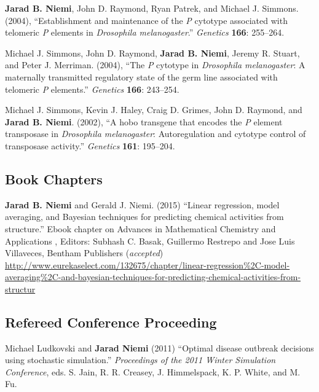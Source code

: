 \documentclass[overlapped,line]{res}
\begin{document}
\begin{resume}
{\bf Jarad B. Niemi}, John D. Raymond, Ryan Patrek, and Michael J. Simmons. (2004), ``Establishment and maintenance of the \emph{P} cytotype associated with telomeric \emph{P} elements in \emph{Drosophila melanogaster}.'' \emph{Genetics} {\bf 166}: 255--264.

Michael J. Simmons, John D. Raymond, {\bf Jarad B. Niemi}, Jeremy R. Stuart, and Peter J. Merriman. (2004), ``The \emph{P} cytotype in \emph{Drosophila melanogaster}: A maternally transmitted regulatory state of the germ line associated with telomeric \emph{P} elements.'' \emph{Genetics} {\bf 166}: 243--254.


Michael J. Simmons, Kevin J. Haley, Craig D. Grimes, John D. Raymond, and {\bf Jarad B. Niemi}. (2002), ``A hobo transgene that encodes the \emph{P} element transposase in \emph{Drosophila melanogaster}: Autoregulation and cytotype control of transposase activity.'' \emph{Genetics} {\bf 161}: 195--204.




\subsection{\bf Book Chapters}

{\bf Jarad B. Niemi} and Gerald J. Niemi. (2015) ``Linear regression, model averaging, and Bayesian techniques for predicting chemical activities from structure.'' Ebook chapter on Advances in Mathematical Chemistry and Applications
, Editors: Subhash C. Basak, Guillermo Restrepo and Jose Luis Villaveces, Bentham Publishers (\emph{accepted}) \url{http://www.eurekaselect.com/132675/chapter/linear-regression%2C-model-averaging%2C-and-bayesian-techniques-for-predicting-chemical-activities-from-structur}


\subsection{\bf Refereed Conference Proceeding}

Michael Ludkovski and {\bf Jarad Niemi} (2011) ``Optimal disease outbreak decisions using stochastic simulation.'' \emph{Proceedings of the 2011 Winter Simulation Conference}, eds. S. Jain, R. R. Creasey, J. Himmelspack, K. P. White, and M. Fu.


\end{resume}
\end{document}

